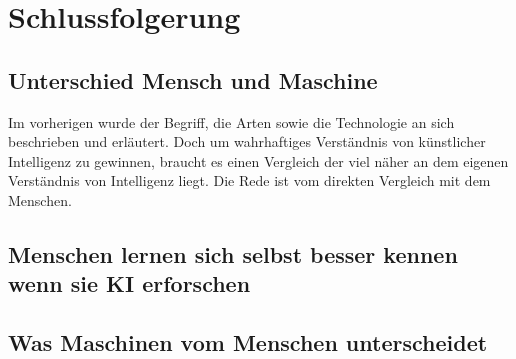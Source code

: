 \documentclass[12pt,german,ngerman]{report}
\begin{document}
\chapter{Schlussfolgerung}
    \section{Unterschied Mensch und Maschine}
        Im vorherigen wurde der Begriff, die Arten sowie die Technologie an sich beschrieben und erläutert.
        Doch um wahrhaftiges Verständnis von künstlicher Intelligenz zu gewinnen, braucht es einen
        Vergleich der viel näher an dem eigenen Verständnis von Intelligenz liegt.
        Die Rede ist vom direkten Vergleich mit dem Menschen.

    \section{Menschen lernen sich selbst besser kennen wenn sie KI erforschen}
            
    \section{Was Maschinen vom Menschen unterscheidet}


    \printbibliography[title={Quellenverzeichnis}]
\end{document}
